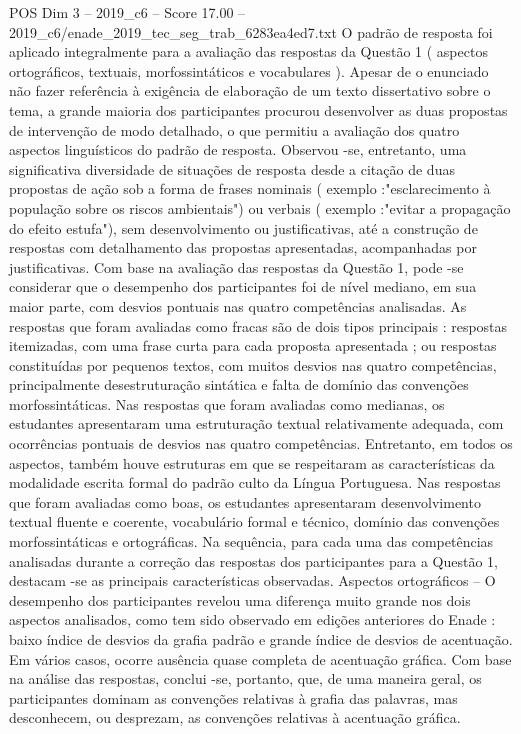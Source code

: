 \begin{textsample}{POS Dim 3 – 2019\_c6 – Score 17.00 – 2019\_c6/enade\_2019\_tec\_seg\_trab\_6283ea4ed7.txt}
O padrão de resposta foi aplicado integralmente para a avaliação das respostas da Questão 1 ( aspectos ortográficos, textuais, morfossintáticos e vocabulares ).
Apesar de o enunciado não fazer referência à exigência de elaboração de um texto dissertativo sobre o tema, a grande maioria dos participantes procurou desenvolver as duas propostas de intervenção de modo detalhado, o que permitiu a avaliação dos quatro aspectos linguísticos do padrão de resposta.
Observou -se, entretanto, uma significativa diversidade de situações de resposta desde a citação de duas propostas de ação sob a forma de frases nominais ( exemplo :"esclarecimento à população sobre os riscos ambientais") ou verbais ( exemplo :"evitar a propagação do efeito estufa"), sem desenvolvimento ou justificativas, até a construção de respostas com detalhamento das propostas apresentadas, acompanhadas por justificativas.
Com base na avaliação das respostas da Questão 1, pode -se considerar que o desempenho dos participantes foi de nível mediano, em sua maior parte, com desvios pontuais nas quatro competências analisadas.
As respostas que foram avaliadas como fracas são de dois tipos principais : respostas itemizadas, com uma frase curta para cada proposta apresentada ; ou respostas constituídas por pequenos textos, com muitos desvios nas quatro competências, principalmente desestruturação sintática e falta de domínio das convenções morfossintáticas.
Nas respostas que foram avaliadas como medianas, os estudantes apresentaram uma estruturação textual relativamente adequada, com ocorrências pontuais de desvios nas quatro competências.
Entretanto, em todos os aspectos, também houve estruturas em que se respeitaram as características da modalidade escrita formal do padrão culto da Língua Portuguesa.
Nas respostas que foram avaliadas como boas, os estudantes apresentaram desenvolvimento textual fluente e coerente, vocabulário formal e técnico, domínio das convenções morfossintáticas e ortográficas.
Na sequência, para cada uma das competências analisadas durante a correção das respostas dos participantes para a Questão 1, destacam -se as principais características observadas.
Aspectos ortográficos – O desempenho dos participantes revelou uma diferença muito grande nos dois aspectos analisados, como tem sido observado em edições anteriores do Enade : baixo índice de desvios da grafia padrão e grande índice de desvios de acentuação.
Em vários casos, ocorre ausência quase completa de acentuação gráfica.
Com base na análise das respostas, conclui -se, portanto, que, de uma maneira geral, os participantes dominam as convenções relativas à grafia das palavras, mas desconhecem, ou desprezam, as convenções relativas à acentuação gráfica.

\end{textsample}
